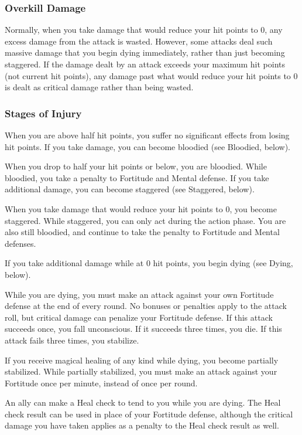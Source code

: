 \subsubsection{Overkill Damage}
Normally, when you take damage that would reduce your hit points to 0, any excess damage from the attack is wasted. However, some attacks deal such massive damage that you begin dying immediately, rather than just becoming staggered. If the damage dealt by an attack exceeds your maximum hit points (not current hit points), any damage past what would reduce your hit points to 0 is dealt as critical damage rather than being wasted.

\subsubsection{Stages of Injury}

 When you are above half hit points, you suffer no significant effects from losing hit points. If you take damage, you can become bloodied (see Bloodied, below).

 When you drop to half your hit points or below, you are bloodied. While bloodied, you take a  penalty to Fortitude and Mental defense. If you take additional damage, you can become staggered (see Staggered, below).

 When you take damage that would reduce your hit points to 0, you become staggered. While staggered, you can only act during the action phase. You are also still bloodied, and continue to take the  penalty to Fortitude and Mental defenses.

If you take additional damage while at 0 hit points, you begin dying (see Dying, below).

\label{Dying} While you are dying, you must make an attack against your own Fortitude defense at the end of every round. No bonuses or penalties apply to the attack roll, but critical damage can penalize your Fortitude defense. If this attack succeeds once, you fall unconscious. If it succeeds three times, you die. If this attack fails three times, you stabilize.

If you receive magical healing of any kind while dying, you become partially stabilized. While partially stabilized, you must make an attack against your Fortitude once per minute, instead of once per round.

An ally can make a Heal check to tend to you while you are dying. The Heal check result can be used in place of your Fortitude defense, although the critical damage you have taken applies as a penalty to the Heal check result as well.

